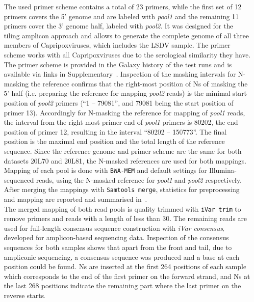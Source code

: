 
The used primer scheme contains a total of 23 primers, while the first set of 12 primers covers the 5' genome and are labeled with \textit{pool1} and the remaining 11 primers cover the 3' genome half, labeled with \textit{pool2}. It was designed for the tiling amplicon approach and allows to generate the complete genome of all three members of Capripoxviruses, which includes the \ac{LSDV} sample. The primer scheme works with all Capripoxviruses due to the serological similarity they have. The primer scheme is provided in the Galaxy history of the test runs and is available via links in Supplementary~. Inspection of the masking intervals for N-masking the reference confirms that the right-most position of Ns of masking the 5' half (i.e. preparing the reference for mapping \textit{pool2} reads) is the minimal start position of \textit{pool2} primers (``1 -- 79081'', and 79081 being the start position of primer 13). Accordingly for N-masking the reference for mapping of \textit{pool1} reads, the interval from the right-most primer-end of \textit{pool1} primers is 80202, the end position of primer 12, resulting in the interval ``80202 -- 150773''. The final position is the maximal end position and the total length of the reference sequence. Since the reference genome and primer scheme are the same for both datasets 20L70 and 20L81, the N-masked references are used for both mappings. Mapping of each pool is done with \texttt{BWA-MEM} and default settings for Illumina-sequenced reads, using the N-masked reference for \textit{pool1} and \textit{pool2} respectively. After merging the mappings with \texttt{Samtools merge}, statistics for preprocessing and mapping are reported and summarised in~. \\
The merged mapping of both read pools is quality trimmed with \texttt{iVar trim} to remove primers and reads with a length of less than 30. The remaining reads are used for full-length consensus sequence construction with \textit{iVar consensus}, developed for amplicon-based sequencing data. Inspection of the consensus sequences for both samples shows that apart from the front and tail, due to ampliconic sequencing, a consensus sequence was produced and a base at each position could be found. Ns are inserted at the first 264 positions of each sample which corresponds to the end of the first primer on the forward strand, and Ns at the last 268 positions indicate the remaining part where the last primer on the reverse starts. 

